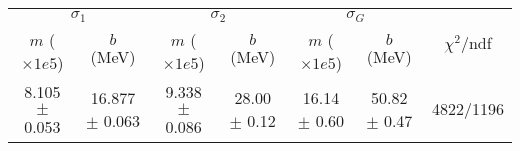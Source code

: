 \begin{tabular}{cc|cc|cc||c}
\multicolumn{2}{c|}{$\sigma_1$} & \multicolumn{2}{|c}{$\sigma_2$} & \multicolumn{2}{|c}{$\sigma_G$}  & \multirow{2}{*}{$\chi^2/$ndf}\\
$m$ ($\times1e5$) & $b$ (MeV) & $m$ ($\times1e5$) & $b$ (MeV) & $m$ ($\times1e5$) & $b$ (MeV) & \\
\hline
8.105 $\pm$ 0.053 & 16.877 $\pm$ 0.063 & 9.338 $\pm$ 0.086 & 28.00 $\pm$ 0.12 & 16.14 $\pm$ 0.60 & 50.82 $\pm$ 0.47 & 4822/1196\\
\end{tabular}
